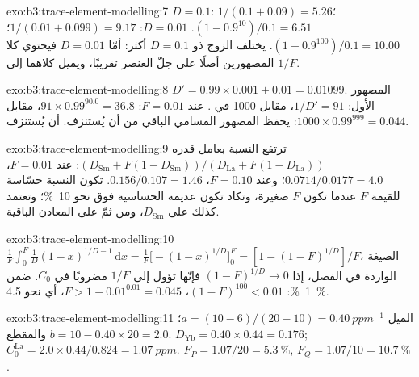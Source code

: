 \begin{solution}{exo:b3:trace-element-modelling:7}
$D = 0.1$:  $1/(0.1 + 0.09) = 5.26$؛  $(1 - 0.9^{10})/0.1 =
6.51$. $D = 0.01$:  $1/(0.01 + 0.099) = 9.17$؛ 
$(1 - 0.9^{100})/0.1 = 10.00$. يختلف الزوج ذو $D = 0.1$ أكثر: أمّا
$D = 0.01$ فيحتوي كلا المصهورين أصلًا على جلّ العنصر تقريبًا، ويميل كلاهما إلى
$1/F$.
\end{solution}

\begin{solution}{exo:b3:trace-element-modelling:8}
$D' = 0.99\times0.001 + 0.01 = 0.01099$. المصهور الأول: $1/D' = 91$، مقابل
1000 في . عند $F = 0.01$: $91\times0.99^{90.0} = 36.8$،
مقابل $1000\times0.99^{999} = 0.044$: يحفظ المصهور المسامي الباقي من أن يُستنزف.
أن يُستنزف.
\end{solution}

\begin{solution}{exo:b3:trace-element-modelling:9}
ترتفع النسبة بعامل قدره $(D_{\mathrm{Sm}} + F(1 - D_{\mathrm{Sm}}))/(D_{\mathrm{La}}
+ F(1 - D_{\mathrm{La}}))$: عند $F = 0.01$، $0.0714/0.0177 = 4.0$؛ وعند $F = 0.10$،
$0.156/0.107 = 1.46$. تكون النسبة حسّاسة للقيمة $F$ عندما تكون $F$ صغيرة، وتكاد
تكون عديمة الحساسية فوق نحو \qty{10}{\percent}؛ وتعتمد كذلك على $D_{\mathrm{Sm}}$،
ومن ثمّ على المعادن الباقية.
\end{solution}

\begin{solution}{exo:b3:trace-element-modelling:10}
$\frac1F\int_0^F \frac1D(1 - x)^{1/D - 1}\,\mathrm dx = \frac1F\bigl[-(1 -
x)^{1/D}\bigr]_0^F = [1 - (1 - F)^{1/D}]/F$، الصيغة الواردة في الفصل، إذا
$(1 - F)^{1/D} \to 0$ فإنّها تؤول إلى $1/F$ مضروبًا في $C_0$. ضمن \qty{1}{\percent}:
$(1 - F)^{100} < 0.01$، $F > 1 - 0.01^{0.01} = 0.045$، أي نحو
\qty{4.5}{\percent}.
\end{solution}

\begin{solution}{exo:b3:trace-element-modelling:11}
الميل $a = (10 - 6)/(20 - 10) = \qty{0.40}{ppm^{-1}}$؛ والمقطع $b = 10 -
0.40\times20 = 2.0$. $D_{\mathrm{Yb}} = 0.40\times0.44 = 0.176$;
$C_0^{\mathrm{La}} = 2.0\times0.44/0.824 = \qty{1.07}{ppm}$. $F_P = 1.07/20 =
\qty{5.3}{\percent}$, $F_Q = 1.07/10 = \qty{10.7}{\percent}$.
\end{solution}

